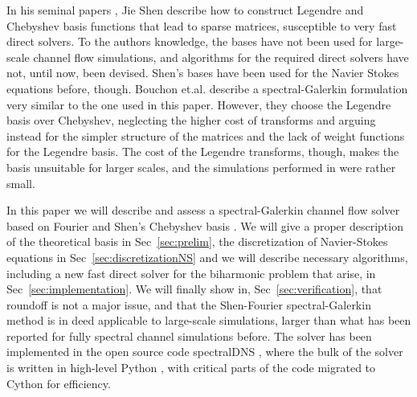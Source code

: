 \documentclass[preprint]{elsarticle}
\begin{document}
In his seminal papers \cite{Shen94,Shen95}, Jie Shen describe how to construct Legendre and Chebyshev basis functions that lead to sparse matrices, susceptible to very fast direct solvers. To the authors knowledge, the bases have not been used for large-scale channel flow simulations, and algorithms for the required direct solvers have not, until now, been devised. Shen's bases have been used for the Navier Stokes equations before, though. Bouchon et.al.  \cite{Bouchon01} describe a spectral-Galerkin formulation very similar to the one used in this paper. However, they choose the Legendre basis over Chebyshev, neglecting the higher cost of transforms and arguing instead for the simpler structure of the matrices and the lack of weight functions for the Legendre basis. The cost of the Legendre transforms, though, makes the basis unsuitable for larger scales, and the simulations performed in \cite{Bouchon01} were rather small.

In this paper we will describe and assess a spectral-Galerkin channel flow solver based on Fourier and Shen's Chebyshev basis \cite{Shen95}. We will give a proper description of the theoretical basis in Sec~\ref{sec:prelim}, the discretization of Navier-Stokes equations in Sec~\ref{sec:discretizationNS} and we will describe necessary algorithms, including a new fast direct solver for the biharmonic problem that arise, in Sec~\ref{sec:implementation}. We will finally show in, Sec~\ref{sec:verification}, that roundoff is not a major issue, and that the Shen-Fourier spectral-Galerkin method is in deed applicable to large-scale simulations, larger than what has been reported for fully spectral channel simulations before. The solver has been implemented in the open source code spectralDNS \cite{spectralDNS}, where the bulk of the solver is written in high-level Python \cite{python}, with critical parts of the code migrated to Cython \cite{cython} for efficiency.
\end{document}
